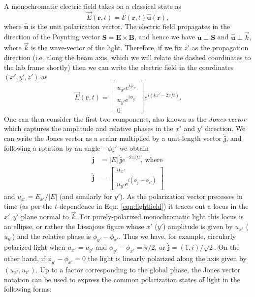 	A monochromatic electric field takes on a classical state as
	\begin{equation}
		\vec{E}(\mathbf{r},t) = \mathcal{E}(\mathbf{r},t)\hat{\mathbf{u}}(\mathbf{r}),
		\label{eqn:lightfield}
	\end{equation}
	where $\hat{\mathbf{u}}$ is the unit polarization vector. The electric field propagates in the direction of the Poynting vector $\mathbf{S} = \mathbf{E}\times\mathbf{B}$, and hence we have $\hat{\mathbf{u}}\perp\mathbf{S}$ and $\hat{\mathbf{u}}\perp\vec{k}$, where $\vec{k}$ is the wave-vector of the light. Therefore, if we fix $z'$ as the propagation direction (i.e. along the beam axis, which we will relate the dashed coordinates to the lab frame shortly) then we can write the electric field in the coordinates $(x',y',z')$ as 
	\begin{equation}
		\vec{E}(\mathbf{r},t) = \begin{bmatrix}u_{x'}e^{i\phi_{x'}}\\
												u_{y'}e^{i\phi_{y'}}\\
												0
												\end{bmatrix}e^{i(kz'-2\pi f t)}.
	\end{equation}
	One can then consider the first two components, also known as the \emph{Jones vector} which captures the amplitude and relative phases in the $x'$ and $y'$ direction.
	We can write the Jones vector as a scalar multiplied by a unit-length vector $\hat{\mathbf{j}}$, and following a rotation by an angle $-\phi_x'$ we obtain
	\begin{align}
		\mathbf{j} &= |E|~\hat{\mathbf{j}}e^{-2\pi i f t},~\mathrm{where}\\
				\hat{\mathbf{j}}&= \begin{bmatrix}u_{x'}\\
								u_{y'}e^{i(\phi_{y'}-\phi_{x'})}\end{bmatrix}
	\end{align}
	and $u_{x'}={E_{x'}}/{|E|}$ (and similarly for $y'$).
	As the polarization vector precesses in time (as per the $t$-dependence in Eqn. \ref{eqn:lightfield}) it traces out a locus in the $x',y'$ plane normal to $\vec{k}$.
	For purely-polarized monochromatic light this locus is an ellipse, or rather the Lissajous figure whose $x'$ ($y'$) amplitude is given by $u_{x'}$ ($u_{y'}$) and the relative phase is $\phi_{y'}-\phi_{x'}$.
	Thus we have, for example, circularly polarized light when $u_{x'}=u_{y'}$ and $\phi_{y'}-\phi_{x'}=\pi/2$, or $\hat{\mathbf{j}} = (1,i)/\sqrt{2}$. On the other hand, if $\phi_{y'}-\phi_{x'}=0$ the light is linearly polarized along the axis given by $(u_{x'},u_{v'})$. 
	Up to a factor corresponding to the global phase, the Jones vector notation can be used to express the common polarization states of light in the following forms:

